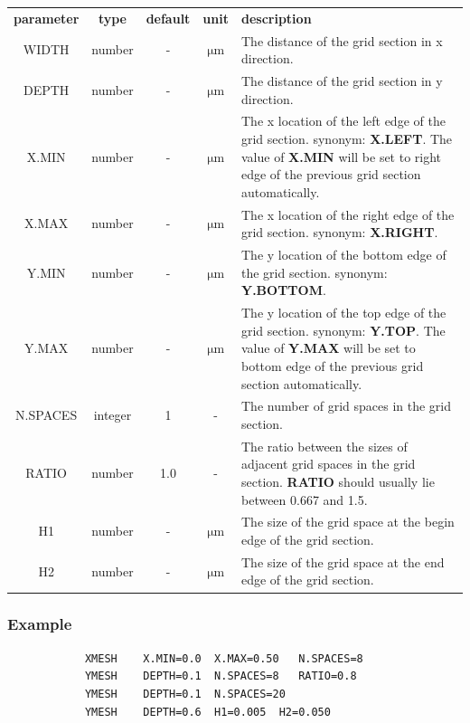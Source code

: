 \documentclass[11pt,pdftex]{article}
\begin{document}
\small
\noindent\begin{longtable}{ccccp{7cm}}
\textbf{parameter}   & \textbf{type}  & \textbf{default} & \textbf{unit} & \textbf{description} \\
WIDTH       & number  & -    & $\mathrm{\mu m}$     & The distance of the grid section in x direction. \\
DEPTH       & number  & -    & $\mathrm{\mu m}$     & The distance of the grid section in y direction. \\
X.MIN       & number  & -    & $\mathrm{\mu m}$     & The x location of the left edge of the grid section.
                                                      synonym: \textbf{X.LEFT}. The value of \textbf{X.MIN} will be set to right
                                                      edge of the previous grid section automatically.\\
X.MAX       & number  & -    & $\mathrm{\mu m}$     & The x location of the right edge of the grid section.
                                                      synonym: \textbf{X.RIGHT}. \\
Y.MIN       & number  & -    & $\mathrm{\mu m}$     & The y location of the bottom edge of the grid section.
                                                      synonym: \textbf{Y.BOTTOM}. \\
Y.MAX       & number  & -    & $\mathrm{\mu m}$     & The y location of the top edge of the grid section.
                                                      synonym: \textbf{Y.TOP}. The value of \textbf{Y.MAX} will be set to bottom
                                                      edge of the previous grid section automatically.\\
N.SPACES    & integer & 1    & -                    & The number of grid spaces in the grid section.\\
RATIO       & number  & 1.0  & -                    & The ratio between the sizes of adjacent grid spaces in the grid
                                                      section. \textbf{RATIO} should usually lie between 0.667 and 1.5. \\
H1          & number  & -    & $\mathrm{\mu m}$     & The size of the grid space at the begin edge of the grid section.\\
H2          & number  & -    & $\mathrm{\mu m}$     & The size of the grid space at the end edge of the grid section.\\
\end{longtable}
\normalsize

\subsubsection*{Example}
\begin{verbatim}
            XMESH    X.MIN=0.0  X.MAX=0.50   N.SPACES=8
            YMESH    DEPTH=0.1  N.SPACES=8   RATIO=0.8
            YMESH    DEPTH=0.1  N.SPACES=20
            YMESH    DEPTH=0.6  H1=0.005  H2=0.050
\end{verbatim}
\end{document}
